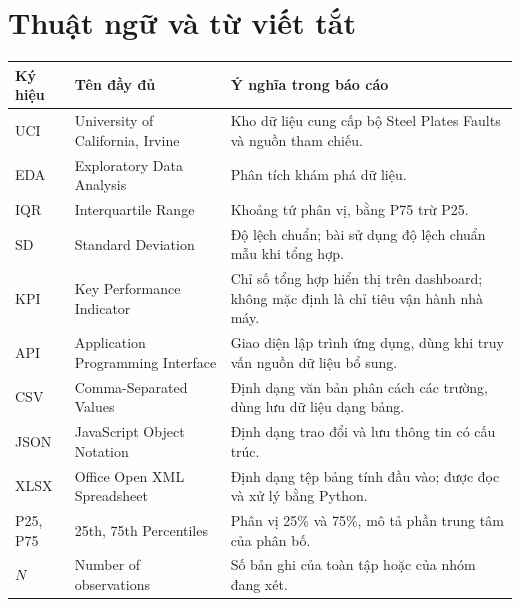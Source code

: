 \documentclass[12pt,a4paper,oneside]{report}
\begin{document}
\renewcommand{\contentsname}{Mục lục}
\renewcommand{\listfigurename}{Danh mục hình vẽ}
\renewcommand{\listtablename}{Danh mục bảng biểu}

{}
\begingroup
{}
\setlength{\parskip}{0pt}
\tableofcontents
\endgroup

\clearpage
{}
{}
\listoffigures

\clearpage
{}
{}
\listoftables
\clearpage
\chapter*{Thuật ngữ và từ viết tắt}

\begin{center}
\small
\begin{tabularx}{\linewidth}{@{}p{1.5cm}Y Y@{}}
\toprule
\textbf{Ký hiệu} & \textbf{Tên đầy đủ} & \textbf{Ý nghĩa trong báo cáo} \\
\midrule
UCI & University of California, Irvine & Kho dữ liệu cung cấp bộ Steel Plates Faults và nguồn tham chiếu. \\
EDA & Exploratory Data Analysis & Phân tích khám phá dữ liệu. \\
IQR & Interquartile Range & Khoảng tứ phân vị, bằng P75 trừ P25. \\
SD & Standard Deviation & Độ lệch chuẩn; bài sử dụng độ lệch chuẩn mẫu khi tổng hợp. \\
KPI & Key Performance Indicator & Chỉ số tổng hợp hiển thị trên dashboard; không mặc định là chỉ tiêu vận hành nhà máy. \\
API & Application Programming Interface & Giao diện lập trình ứng dụng, dùng khi truy vấn nguồn dữ liệu bổ sung. \\
CSV & Comma-Separated Values & Định dạng văn bản phân cách các trường, dùng lưu dữ liệu dạng bảng. \\
JSON & JavaScript Object Notation & Định dạng trao đổi và lưu thông tin có cấu trúc. \\
XLSX & Office Open XML Spreadsheet & Định dạng tệp bảng tính đầu vào; được đọc và xử lý bằng Python. \\
P25, P75 & 25th, 75th Percentiles & Phân vị 25\% và 75\%, mô tả phần trung tâm của phân bố. \\
$N$ & Number of observations & Số bản ghi của toàn tập hoặc của nhóm đang xét. \\
\bottomrule
\end{tabularx}
\end{center}
\end{document}
